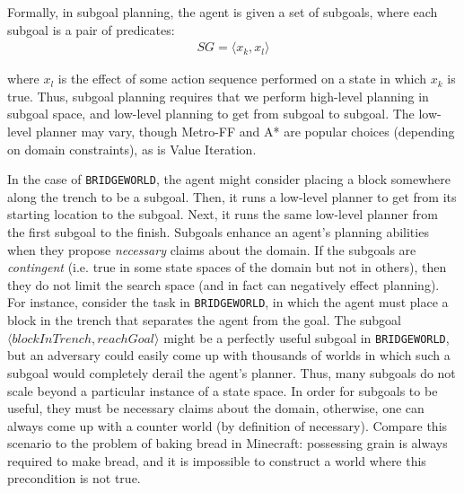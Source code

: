 \documentclass[]{article}
\begin{document}
Formally, in subgoal planning, the agent is given a set of subgoals, where each subgoal is a pair of predicates:
\begin{align}
SG = \langle x_k, x_l \rangle
\end{align}

where $x_l$ is the effect of some action sequence performed on 
a state in which $x_k$ is true. Thus, subgoal planning requires 
that we perform high-level planning in subgoal space, and low-level 
planning to get from subgoal to subgoal. The low-level planner may vary, though
Metro-FF and A* are popular choices (depending on domain constraints), as is Value Iteration.

In the case of \texttt{BRIDGEWORLD}, the agent might consider placing
a block somewhere along the trench to be a subgoal. Then, it runs
a low-level planner to get from its starting location to the subgoal.
Next, it runs the same low-level planner from the first subgoal to the finish.
Subgoals enhance an agent's planning abilities when they propose {\it
  necessary} claims about the domain. If the subgoals are {\it
  contingent} (i.e. true in some state spaces of the domain but not in
others), then they do not limit the search space (and in fact can negatively 
effect planning). For instance, consider the task in \texttt{BRIDGEWORLD}, 
in which the agent must place a block in the trench that separates the agent 
from the goal. The subgoal $\langle blockInTrench, reachGoal\rangle$ might be a
perfectly useful subgoal in \texttt{BRIDGEWORLD}, but an adversary
could easily come up with thousands of worlds in which such a subgoal
would completely derail the agent's planner. Thus, many subgoals do
not scale beyond a particular instance of a state space. In order for
subgoals to be useful, they must be necessary claims about the domain,
otherwise, one can always come up with a counter world (by definition
of necessary).  Compare this scenario to the problem of baking bread
in Minecraft: possessing grain is always required to make bread, and it
is impossible to construct a world where this precondition is not
true.
\end{document}
